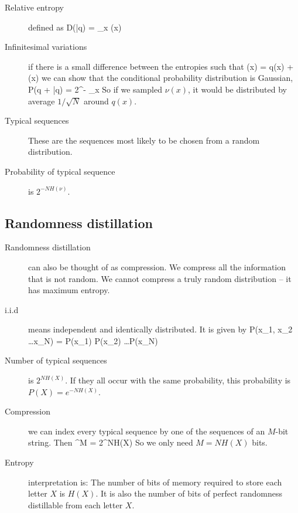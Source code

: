 \begin{description}
\item[Relative entropy] defined as
\beq
D(\nu|q) = \sum_x \nu(x) 
\eeq


\item[Infinitesimal variations] if there is a small difference between the entropies such that
\beq
\nu(x) = q(x) + \delta(x)
\eeq
we can show that the conditional probability distribution is Gaussian, 
\beq
P(q + \delta|q) = 2^{-  \sum_x }
\eeq
So if we sampled $\nu(x)$, it would be distributed by average $1/\sqrt{N}$ around $q(x)$. 

\item[Typical sequences] These are the sequences most likely to be chosen from a random distribution. 

\item[Probability of typical sequence] is $2^{- NH(\nu)}$. 

\end{description}

\subsection{Randomness distillation}
\begin{description}
\item[Randomness distillation] can also be thought of as compression. We compress all the information that is not random. We cannot compress a truly random distribution -- it has maximum entropy. 

\item[i.i.d] means independent and identically distributed. It is given by 
\beq
P(x_1, x_2 \ldots x_N) = P(x_1) P(x_2) \ldots P(x_N)
\eeq

\item[Number of typical sequences] is $2^{N H(X)}$. If they all occur with the same probability, this probability is $P(X) = e^{- NH(X)}$. 

\item[Compression] we can index every typical sequence by one of the sequences of an $M$-bit string. Then
^M = 2^{NH(X)}
\eeq
So we only need $M = NH(X)$ bits. 

\item[Entropy] interpretation is: The number of bits of memory required to store each letter $X$ is $H(X)$. It is also the number of bits of perfect randomness distillable from each letter $X$. 

\end{description}

